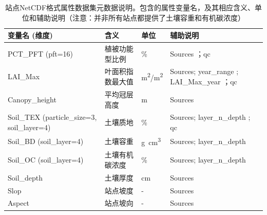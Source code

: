 \begin{table}[htbp]
  \begin{threeparttable}
    \centering
    \caption[站点NetCDF格式属性数据集元数据说明]{站点NetCDF格式属性数据集元数据说明。包含的属性变量名，及其相应含义、单位和辅助说明（注意：并非所有站点都提供了土壤容重和有机碳浓度）}
    \label{tab:站点数据元数据}
    \begin{tabular}{p{9.75em}p{10.25em}p{3.5em}p{9.5em}}
      \toprule
      \textbf{变量名 (维度)}                               & \textbf{含义}             & \textbf{单位}  & \textbf{辅助说明}                                            \\
      \midrule
      PCT\_PFT (pft=16)                                    & 植被功能型比例            & \%             & Sources\tnote{a} ；qc                                        \\
      LAI\_Max                                             & 叶面积指数最大值          & \unit{m^2/m^2} & Sources; year\_range\tnote{b} ; LAI\_Max\_year\tnote{c} ；qc \\
      Canopy\_height                                       & 平均冠层高度              & m              & Sources                                                      \\
      Soil\_TEX \newline (particle\_size=3, soil\_layer=4) & 土壤质地                  & \%             & Sources; layer\_n\_depth\tnote{d} ; qc                       \\
      Soil\_BD (soil\_layer=4)                             & 土壤容重                  & \unit{g.cm^3}  & Sources; layer\_n\_depth                                     \\
      Soil\_OC (soil\_layer=4)                             & 土壤有机碳浓度            & \%             & Sources; layer\_n\_depth                                     \\
      Soil\_depth                                          & 土壤厚度                  & cm             & Sources                                                      \\
      Slop                                                 & 站点坡度                  & -              & Sources                                                      \\
      Aspect                                               & 站点坡向                  & -              & Sources                                                      \\

\end{tabular}
\end{threeparttable}
\end{table}

